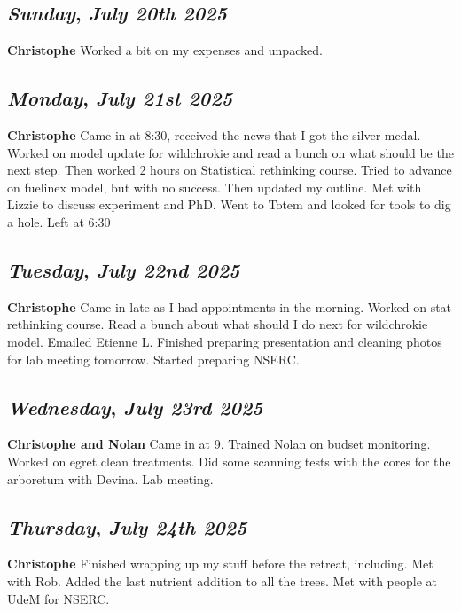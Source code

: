\def\day{\textit{July 20th 2025}}
\def\weekday{\textit{Sunday}}
\subsection*{\weekday, \day}
\textbf {Christophe}
Worked a bit on my expenses and unpacked. 

\def\day{\textit{July 21st 2025}}
\def\weekday{\textit{Monday}}
\subsection*{\weekday, \day}
\textbf {Christophe}
Came in at 8:30, received the news that I got the silver medal. Worked on model update for wildchrokie and read a bunch on what should be the next step. Then worked 2 hours on Statistical rethinking course. Tried to advance on fuelinex model, but with no success. Then updated my outline. Met with Lizzie to discuss experiment and PhD. Went to Totem and looked for tools to dig a hole. Left at 6:30

\def\day{\textit{July 22nd 2025}}
\def\weekday{\textit{Tuesday}}
\subsection*{\weekday, \day}
\textbf {Christophe}
Came in late as I had appointments in the morning. Worked on stat rethinking course. Read a bunch	about what should I do next for wildchrokie model. Emailed Etienne L. Finished preparing presentation and cleaning photos for lab meeting tomorrow. Started preparing NSERC. 

\def\day{\textit{July 23rd 2025}}
\def\weekday{\textit{Wednesday}}
\subsection*{\weekday, \day}
\textbf {Christophe and Nolan}
Came in at 9. Trained Nolan on budset monitoring. Worked on egret clean treatments. Did some scanning tests with the cores for the arboretum with Devina. Lab meeting.

\def\day{\textit{July 24th 2025}}
\def\weekday{\textit{Thursday}}
\subsection*{\weekday, \day}
\textbf {Christophe}
Finished wrapping up my stuff before the retreat, including. Met with Rob. Added the last nutrient addition to all the trees. Met with people at UdeM for NSERC.


